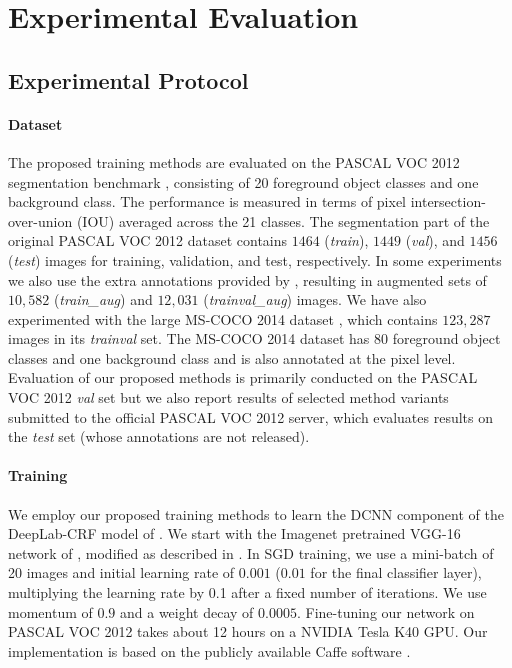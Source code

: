\section{Experimental Evaluation}
\label{sec:experiments}

\subsection{Experimental Protocol}

\paragraph{Dataset} 
\label{sec:dataset}

The proposed training methods are evaluated on the PASCAL
VOC 2012 segmentation benchmark \citep{everingham2014pascal},
consisting of 20 foreground object classes and one background
class. The performance is measured in terms of pixel
intersection-over-union (IOU) averaged across the 21 classes. The
segmentation part of the original PASCAL VOC 2012 dataset contains
$1464$ (\textsl{train}), $1449$ (\textsl{val}), and $1456$
(\textsl{test}) images for training, validation, and test,
respectively. In some experiments we also use the extra annotations
provided by \citet{hariharan2011semantic}, resulting in augmented sets
of $10,582$ (\textsl{train\_aug}) and $12,031$
(\textsl{trainval\_aug}) images. We have also experimented with the
large MS-COCO 2014 dataset \citep{lin2014microsoft}, which contains
$123,287$ images in its \textsl{trainval} set. The MS-COCO 2014
dataset has $80$ foreground object classes and one background class
and is also annotated at the pixel level.
Evaluation of our proposed methods is primarily conducted on the
PASCAL VOC 2012 \textsl{val} set but we also report results of selected
method variants submitted to the official PASCAL VOC 2012 server, which
evaluates results on the \textsl{test} set (whose annotations are not
released).

\paragraph{Training}

We employ our proposed training methods to learn the DCNN component of
the DeepLab-CRF model of \citet{chen2014semantic}. We start with the
Imagenet \citep{deng2009imagenet} pretrained VGG-16 network of
\citet{simonyan2014very}, modified as described in
\citet{chen2014semantic}. In SGD training, we use a mini-batch of 20
images and initial learning rate of $0.001$ ($0.01$ for the final
classifier layer), multiplying the learning rate by 0.1 after a fixed
number of iterations. We use momentum of $0.9$ and a weight decay of
$0.0005$. Fine-tuning our network on PASCAL VOC 2012 takes about 12
hours on a NVIDIA Tesla K40 GPU. Our implementation is based on the
publicly available Caffe software \citep{jia2014caffe}.

